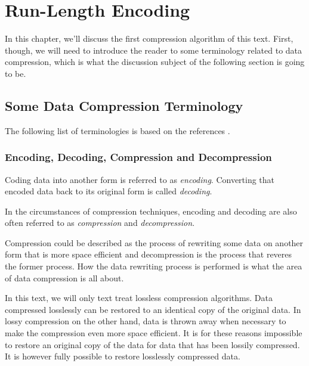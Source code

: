 \begin{comment}
  
\end{comment}

\chapter{Run-Length Encoding}
\label{cha:rle}

In this chapter, we'll discuss the first compression algorithm of this
text. First, though, we will need to introduce the reader to some
terminology related to data compression, which is what the discussion
subject of the following section is going to be.

\section{Some Data Compression Terminology}

The following list of terminologies is based on the references
\cite{Salomon:2004:DCC,mark1996data_compression_book,Bell:1989:MTC:76894.76896}.

\subsection{Encoding, Decoding, Compression and Decompression}

Coding data into another form is referred to as
\textit{encoding}. Converting that encoded data back
to its original form is called \textit{decoding}.

In the circumstances of compression techniques, encoding and decoding
are also often referred to as \textit{compression}
and \textit{decompression}.

Compression could be described as the process of rewriting some data
on another form that is more space efficient and decompression is the
process that reveres the former process. How the data rewriting
process is performed is what the area of data compression is all
about.

In this text, we will only text treat lossless compression
algorithms. Data compressed losslessly can be restored to an identical
copy of the original data. In lossy compression on the other hand,
data is thrown away when necessary to make the compression even more
space efficient. It is for these reasons impossible to restore an
original copy of the data for data that has been lossily
compressed. It is however fully possible to restore losslessly
compressed data.


